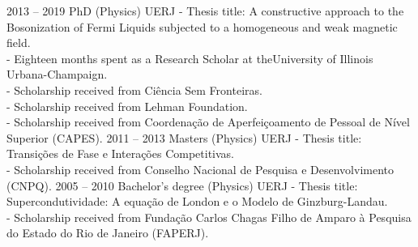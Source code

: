 \documentclass[9pt]{developercv} %
\begin{document}
\begin{entrylist}
	\entry
	{2013 -- 2019}
	{PhD (Physics)}
	{UERJ}
	{- Thesis title: A constructive approach to the Bosonization of Fermi Liquids subjected to a homogeneous and weak magnetic field.\\ 
		- Eighteen months spent as a Research Scholar at theUniversity of Illinois Urbana-Champaign.\\
		- Scholarship received from Ci\^encia Sem Fronteiras.\\
		- Scholarship received from Lehman Foundation.\\
		- Scholarship received from Coordenação de Aperfeiçoamento de Pessoal de Nível Superior (CAPES).}
	\entry
	{2011 -- 2013}
	{Masters (Physics)}
	{UERJ}
	{- Thesis title: Transições de Fase e Interações Competitivas.\\
		- Scholarship received from Conselho Nacional de Pesquisa e Desenvolvimento (CNPQ).}
	\entry
	{2005 -- 2010}
	{Bachelor's degree (Physics)}
	{UERJ}
	{- Thesis title: Supercondutividade: A equação de London e o Modelo de Ginzburg-Landau.\\
		- Scholarship received from Fundação Carlos Chagas Filho de Amparo à Pesquisa do Estado do Rio de  Janeiro (FAPERJ).}
\end{entrylist}

\end{document}
